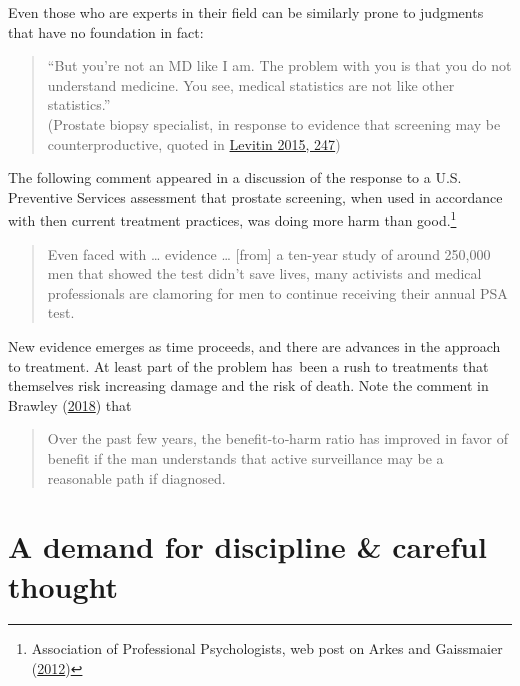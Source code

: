 \documentclass[
  10pt,
  b5paper]{book}
\begin{document}
Even those who are experts in their field can be similarly prone to judgments
that have no foundation in fact:

\begin{quote}
``But you're not an MD like I am. The problem with you is that you
do not understand medicine. You see, medical statistics are not
like other statistics.''\\
(Prostate biopsy specialist, in response to evidence that screening
may be counterproductive, quoted in \protect\hyperlink{ref-levitin_2015}{Levitin 2015, 247})
\end{quote}

The following comment appeared in a discussion of the response
to a U.S. Preventive Services assessment that prostate screening,
when used in accordance with then current treatment practices,
was doing more harm than good.\footnote{Association of Professional
  Psychologists, web post on Arkes and Gaissmaier (\protect\hyperlink{ref-arkes2012psychological}{2012})}

\begin{quote}
Even faced with \ldots{} evidence \ldots{} {[}from{]} a ten-year study of around 250,000 men that showed the test didn't save lives, many activists and medical professionals are clamoring for men to continue receiving their annual PSA test.
\end{quote}

New evidence emerges as time proceeds, and there are advances in the
approach to treatment. At least part of the problem has~been a rush
to treatments that themselves risk increasing damage and the risk of
death. Note the comment in Brawley (\protect\hyperlink{ref-brawley2018prostate}{2018}) that

\begin{quote}
Over the past few years, the benefit‐to‐harm ratio has
improved in favor of benefit if the man understands that
active surveillance may be a reasonable path if diagnosed.
\end{quote}

\hypertarget{a-demand-for-discipline-careful-thought}{%
\section{A demand for discipline \& careful thought}\label{a-demand-for-discipline-careful-thought}}
\end{document}
